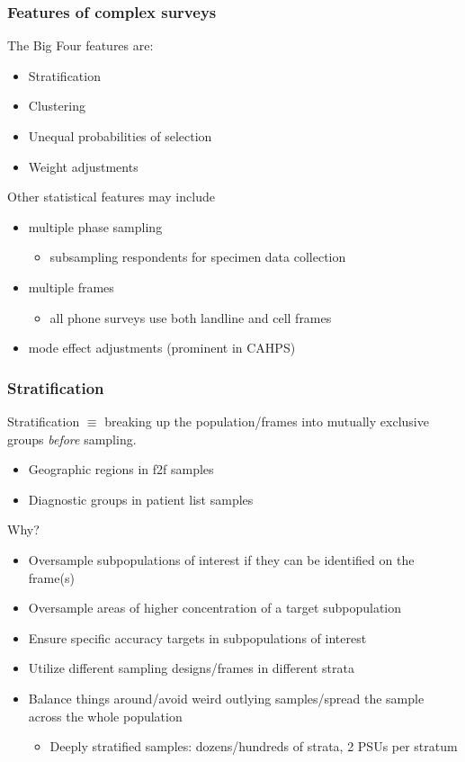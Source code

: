 \documentclass[aspectratio=43]{beamer}
\begin{document}
\begin{frame}\frametitle{Features of complex surveys}

The Big Four features are:

\begin{itemize}
    \item Stratification
    \item Clustering
    \item Unequal probabilities of selection
    \item Weight adjustments
\end{itemize}

Other statistical features may include
\begin{itemize}
    \item multiple phase sampling
        \begin{itemize} \item subsampling respondents for specimen data collection \end{itemize}
    \item multiple frames
        \begin{itemize} \item all phone surveys use both landline and cell frames \end{itemize}
    \item mode effect adjustments (prominent in CAHPS)
\end{itemize}

\end{frame}

\begin{frame}\frametitle{Stratification}

Stratification $\equiv$ breaking up the population/frames into mutually exclusive groups \textit{before} sampling.
\begin{itemize}
    \item Geographic regions in f2f samples
    \item Diagnostic groups in patient list samples
\end{itemize}

Why?

\begin{itemize}
    \item Oversample subpopulations of interest if they can be identified on the frame(s)
    \item Oversample areas of higher concentration of a target subpopulation
    \item Ensure specific accuracy targets in subpopulations of interest
    \item Utilize different sampling designs/frames in different strata
    \item Balance things around/avoid weird outlying samples/spread the sample across the whole population
    \begin{itemize} \item Deeply stratified samples: dozens/hundreds of strata, 2 PSUs per stratum \end{itemize}
\end{itemize}



\end{frame}
\end{document}
